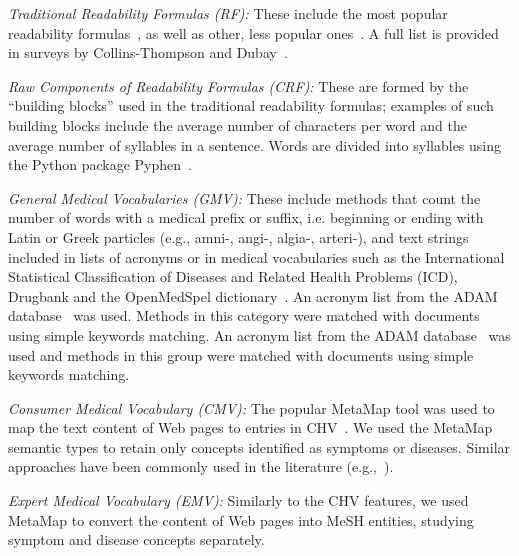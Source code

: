 

\textit{Traditional Readability Formulas (RF):}
These include the most popular readability formulas~\cite{cli75,dale48,flesch75}, as well as other, less popular ones~\cite{ari67,gunning52,lix,smog69}. A full list is provided in surveys by Collins-Thompson \cite{collins2014computational} and Dubay~\cite{dubay04}.

\textit{Raw Components of Readability Formulas (CRF):}
These are formed by the ``building blocks'' used in the traditional readability formulas; examples of such building blocks include the average number of characters per word and the average number of syllables in a sentence. Words are divided into syllables using the Python package Pyphen~\cite{pyphen}.

\textit{General Medical Vocabularies (GMV):}
These include methods that count the number of words with a medical prefix or suffix, i.e. beginning or ending with Latin or Greek particles (e.g., amni-, angi-, algia-, arteri-), and text strings included in lists of acronyms or in medical vocabularies such as the International Statistical Classification of Diseases and Related Health Problems (ICD), Drugbank and the OpenMedSpel dictionary~\cite{openmedspel}. An acronym list from the ADAM database~\cite{zhou2006} was used. Methods in this category were matched with documents using simple keywords matching. An acronym list from the ADAM database~\cite{zhou2006} was used and methods in this group were matched with documents using simple keywords matching.

\textit{Consumer Medical Vocabulary (CMV):}
The popular MetaMap \cite{aronson10} tool was used to map the text content of Web pages to entries in  CHV~\cite{zeng06}.
We used the MetaMap semantic types to retain only concepts identified as symptoms or diseases. Similar approaches have been commonly used in the literature (e.g.,~\cite{pang16,agrafiotesA16,palotti16,yates13}).

\textit{Expert Medical Vocabulary (EMV):}
Similarly to the CHV features, we used MetaMap to convert the content of Web pages into MeSH entities, studying symptom and disease concepts separately. 

